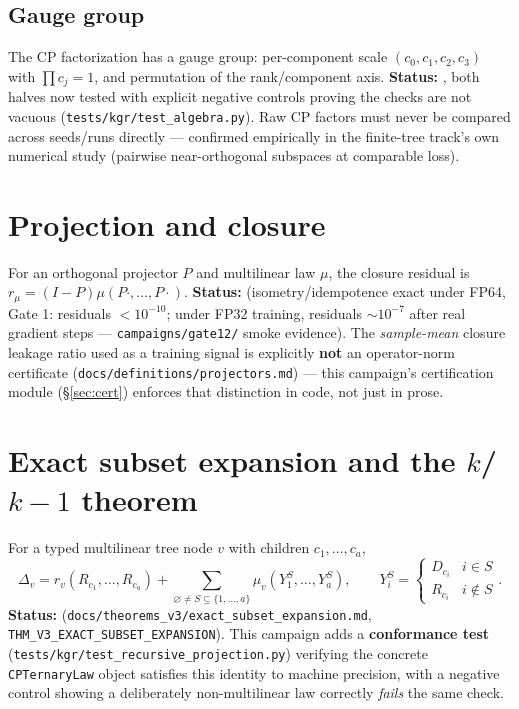 \documentclass[11pt]{article}
\begin{document}
\subsection{Gauge group}
The CP factorization has a gauge group: per-component scale $(c_0,c_1,c_2,c_3)$ with
$\prod c_j = 1$, and permutation of the rank/component axis. \textbf{Status: \DefC}, both halves
now tested with explicit negative controls proving the checks are not vacuous
(\texttt{tests/kgr/test\_algebra.py}). Raw CP factors must never be compared across seeds/runs
directly --- confirmed empirically in the finite-tree track's own numerical study (pairwise
near-orthogonal subspaces at comparable loss).

\section{Projection and closure}
For an orthogonal projector $P$ and multilinear law $\mu$, the closure residual is
$r_\mu = (I-P)\mu(P\cdot,\ldots,P\cdot)$. \textbf{Status: \ProvedU} (isometry/idempotence exact
under FP64, Gate 1: residuals $<10^{-10}$; under FP32 training, residuals $\sim10^{-7}$ after real
gradient steps --- \texttt{campaigns/gate12/} smoke evidence). The \emph{sample-mean} closure
leakage ratio used as a training signal is explicitly \textbf{not} an operator-norm certificate
(\texttt{docs/definitions/projectors.md}) --- this campaign's certification module
(\S\ref{sec:cert}) enforces that distinction in code, not just in prose.

\section{Exact subset expansion and the $k$/$k-1$ theorem}
For a typed multilinear tree node $v$ with children $c_1,\ldots,c_a$,
\[
  \Delta_v = r_v(R_{c_1},\ldots,R_{c_a}) + \!\!\sum_{\varnothing \neq S \subseteq \{1,\ldots,a\}}\!\! \mu_v(Y_1^S,\ldots,Y_a^S),
  \qquad Y_i^S = \begin{cases} D_{c_i} & i \in S \\ R_{c_i} & i \notin S\end{cases}.
\]
\textbf{Status: \Proved} (\texttt{docs/theorems\_v3/exact\_subset\_expansion.md},
\texttt{THM\_V3\_EXACT\_SUBSET\_EXPANSION}). This campaign adds a \textbf{conformance test}
(\texttt{tests/kgr/test\_recursive\_projection.py}) verifying the concrete \texttt{CPTernaryLaw}
object satisfies this identity to machine precision, with a negative control showing a
deliberately non-multilinear law correctly \emph{fails} the same check.
\end{document}
